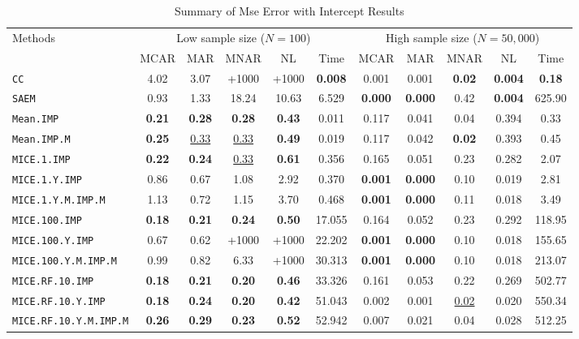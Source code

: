 \begin{table}[h!]
\centering
\begin{tabular}{l cccc c cccc c}
\toprule
\multirow{2}{*}{Methods}
& \multicolumn{5}{c}{Low sample size ($N=100$)} & \multicolumn{5}{c}{High sample size ($N=50,000$)} \\
\cmidrule(lr){2-6} \cmidrule(lr){7-11}
& MCAR & MAR & MNAR & NL & Time & MCAR & MAR & MNAR & NL & Time \\
\midrule
\texttt{CC} & 4.02 & 3.07 & +1000 & +1000 & \textbf{0.008} & 0.001 & 0.001 & \textbf{0.02} & \textbf{0.004} & \textbf{0.18} \\
\texttt{SAEM} & 0.93 & 1.33 & 18.24 & 10.63 & 6.529 & \textbf{0.000} & \textbf{0.000} & 0.42 & \textbf{0.004} & 625.90 \\
\texttt{Mean.IMP} & \textbf{0.21} & \textbf{0.28} & \textbf{0.28} & \textbf{0.43} & 0.011 & 0.117 & 0.041 & 0.04 & 0.394 & 0.33 \\
\texttt{Mean.IMP.M} & \textbf{0.25} & \underline{0.33} & \underline{0.33} & \textbf{0.49} & 0.019 & 0.117 & 0.042 & \textbf{0.02} & 0.393 & 0.45 \\
\texttt{MICE.1.IMP} & \textbf{0.22} & \textbf{0.24} & \underline{0.33} & \textbf{0.61} & 0.356 & 0.165 & 0.051 & 0.23 & 0.282 & 2.07 \\
\texttt{MICE.1.Y.IMP} & 0.86 & 0.67 & 1.08 & 2.92 & 0.370 & \textbf{0.001} & \textbf{0.000} & 0.10 & 0.019 & 2.81 \\
\texttt{MICE.1.Y.M.IMP.M} & 1.13 & 0.72 & 1.15 & 3.70 & 0.468 & \textbf{0.001} & \textbf{0.000} & 0.11 & 0.018 & 3.49 \\
\texttt{MICE.100.IMP} & \textbf{0.18} & \textbf{0.21} & \textbf{0.24} & \textbf{0.50} & 17.055 & 0.164 & 0.052 & 0.23 & 0.292 & 118.95 \\
\texttt{MICE.100.Y.IMP} & 0.67 & 0.62 & +1000 & +1000 & 22.202 & \textbf{0.001} & \textbf{0.000} & 0.10 & 0.018 & 155.65 \\
\texttt{MICE.100.Y.M.IMP.M} & 0.99 & 0.82 & 6.33 & +1000 & 30.313 & \textbf{0.001} & \textbf{0.000} & 0.10 & 0.018 & 213.07 \\
\texttt{MICE.RF.10.IMP} & \textbf{0.18} & \textbf{0.21} & \textbf{0.20} & \textbf{0.46} & 33.326 & 0.161 & 0.053 & 0.22 & 0.269 & 502.77 \\
\texttt{MICE.RF.10.Y.IMP} & \textbf{0.18} & \textbf{0.24} & \textbf{0.20} & \textbf{0.42} & 51.043 & 0.002 & 0.001 & \underline{0.02} & 0.020 & 550.34 \\
\texttt{MICE.RF.10.Y.M.IMP.M} & \textbf{0.26} & \textbf{0.29} & \textbf{0.23} & \textbf{0.52} & 52.942 & 0.007 & 0.021 & 0.04 & 0.028 & 512.25 \\
\bottomrule
\end{tabular}
\caption{Summary of Mse Error with Intercept Results}
\label{tab:mse_error_with_intercept_summary}
\end{table}
